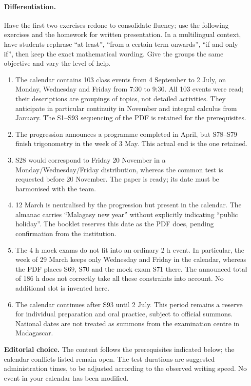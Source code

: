 \paragraph{Differentiation.} Have the first two exercises redone to consolidate fluency; use the following exercises and the homework for written presentation. In a multilingual context, have students rephrase ``at least'', ``from a certain term onwards'', ``if and only if'', then keep the exact mathematical wording. Give the groups the same objective and vary the level of help.
\begin{enumerate}
\item The calendar contains 103 class events from 4 September to 2 July, on Monday, Wednesday and Friday from 7:30 to 9:30. All 103 events were read; their descriptions are groupings of topics, not detailed activities. They anticipate in particular continuity in November and integral calculus from January. The S1--S93 sequencing of the PDF is retained for the prerequisites.
\item The progression announces a programme completed in April, but S78--S79 finish trigonometry in the week of 3 May. This actual end is the one retained.
\item S28 would correspond to Friday 20 November in a Monday/Wednesday/Friday distribution, whereas the common test is requested before 20 November. The paper is ready; its date must be harmonised with the team.
\item 12 March is neutralised by the progression but present in the calendar. The almanac carries ``Malagasy new year'' without explicitly indicating ``public holiday''. The booklet reserves this date as the PDF does, pending confirmation from the institution.
\item The 4 h mock exams do not fit into an ordinary 2 h event. In particular, the week of 29 March keeps only Wednesday and Friday in the calendar, whereas the PDF places S69, S70 and the mock exam S71 there. The announced total of 186 h does not correctly take all these constraints into account. No additional slot is invented here.
\item The calendar continues after S93 until 2 July. This period remains a reserve for individual preparation and oral practice, subject to official summons. National dates are not treated as summons from the examination centre in Madagascar.
\end{enumerate}
\textbf{Editorial choice.} The content follows the prerequisites indicated below; the calendar conflicts listed remain open. The test durations are suggested administration times, to be adjusted according to the observed writing speed. No event in your calendar has been modified.
\fi
\tableofcontents
\mxnewpage
